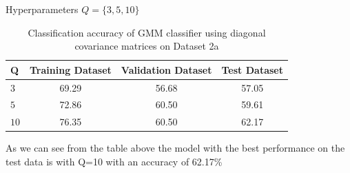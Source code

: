 \documentclass[11pt]{article}
\begin{document}
Hyperparameters $Q = \{3,5,10\}$
\begin{table}[h!]
\label{tab:tab1.1.1}
\begin{center}
\begin{tabular}{|l|c|c|c|}
\hline
\textbf{Q } & \textbf{Training Dataset} & \textbf{Validation Dataset} &\textbf{Test Dataset}\\
\hline
$3$ & 69.29 & 56.68 & 57.05\\
\hline
$5$ & 72.86 & 60.50 & 59.61\\
\hline
$10$ & 76.35 & 60.50 & 62.17\\
\hline
\end{tabular}
\caption{Classification accuracy of GMM classifier using diagonal covariance matrices on Dataset 2a}
\end{center}
\end{table}

As we can see from the table above the model with the best performance on the test data is with  Q=10 with an accuracy of 62.17\% 
\end{document}
